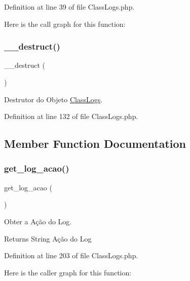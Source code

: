 Definition at line 39 of file Class\+Logs.\+php.

Here is the call graph for this function\+:
\mbox{\label{class_class_logs_a421831a265621325e1fdd19aace0c758}} 
\subsubsection{\texorpdfstring{\+\_\+\+\_\+destruct()}{\_\_destruct()}}
{\footnotesize\ttfamily \+\_\+\+\_\+destruct (\begin{DoxyParamCaption}{ }\end{DoxyParamCaption})}



Destrutor do Objeto \hyperlink{class_class_logs}{Class\+Logs}. 



Definition at line 132 of file Class\+Logs.\+php.



\subsection{Member Function Documentation}
\mbox{\label{class_class_logs_ab8ea2a06dc1b1809230c9bb0a5ae929b}} 
\subsubsection{\texorpdfstring{get\+\_\+log\+\_\+acao()}{get\_log\_acao()}}
{\footnotesize\ttfamily get\+\_\+log\+\_\+acao (\begin{DoxyParamCaption}{ }\end{DoxyParamCaption})}



Obter a Ação do Log. 

\begin{DoxyReturn}{Returns}
String Ação do Log 
\end{DoxyReturn}


Definition at line 203 of file Class\+Logs.\+php.

Here is the caller graph for this function\+:
\mbox{\label{class_class_logs_a407b29a24c5deb4125384b32f92b17db}} 
